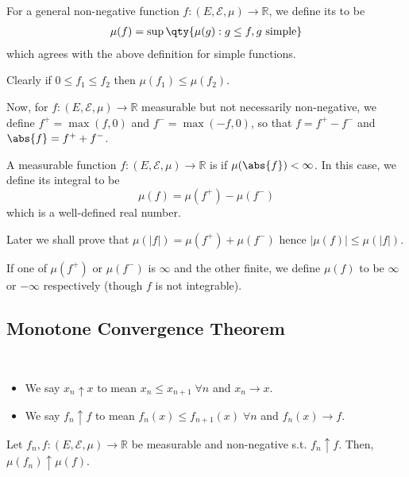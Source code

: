 \begin{definition}[$\mu$-integral]
	For a general non-negative function $f \colon (E,\mathcal E,\mu) \to \mathbb R$, we define its  to be
	\begin{align*}
		\mu(f) = \sup\qty{\mu(g) : g \leq f, g \text{ simple}}
	\end{align*}
	which agrees with the above definition for simple functions.
\end{definition}

Clearly if $0 \leq f_1 \leq f_2$ then $\mu(f_1) \leq \mu(f_2)$.

Now, for $f \colon (E,\mathcal E,\mu) \to \mathbb R$ measurable but not necessarily non-negative, we define $f^+ = \max(f,0)$ and $f^- = \max(-f,0)$, so that $f = f^+ - f^-$ and $\abs{f} = f^+ + f^-$.
\begin{definition}[$\mu$-integrable]
	A measurable function $f \colon (E,\mathcal E,\mu) \to \mathbb R$ is  if $\mu(\abs{f}) < \infty$.
	In this case, we define its integral to be
	\[ \mu(f) = \mu(f^+) - \mu(f^-) \]
	which is a well-defined real number.
\end{definition}
Later we shall prove that $\mu(|f|) = \mu(f^+) + \mu(f^-)$ hence $|\mu(f)| \leq \mu(|f|)$.

If one of $\mu(f^+)$ or $\mu(f^-)$ is $\infty$ and the other finite, we define $\mu(f)$ to be $\infty$ or $-\infty$ respectively (though $f$ is not integrable).

\subsection{Monotone Convergence Theorem}
\begin{notation} \
	\begin{itemize}
		\item 	We say $x_n \uparrow x$ to mean $x_n \leq x_{n+1} \; \forall n$ and $x_n \to x$.
		\item 	We say $f_n \uparrow f$ to mean $f_n(x) \leq f_{n+1}(x) \; \forall n$ and $f_n(x) \to f$.
	\end{itemize}
\end{notation}

\begin{theorem} \label{thm:mct}
	Let $f_n, f \colon (E,\mathcal E,\mu) \to \mathbb R$ be measurable and non-negative s.t. $f_n \uparrow f$.
	Then, $\mu(f_n) \uparrow \mu(f)$.
\end{theorem}

